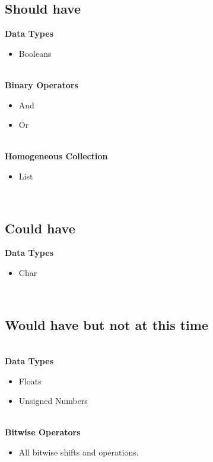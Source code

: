 \subsection{Should have }
\textbf{Data Types }
\begin{itemize} 
    \item Booleans
\end{itemize} 
\\
\textbf{Binary Operators} 
\begin{itemize} 
    \item And
    \item Or
\end{itemize} 
\\
\textbf{Homogeneous Collection }
\begin{itemize} 
    \item List
\end{itemize} 
\\
\subsection{Could have}
\textbf{Data Types }
\begin{itemize} 
    \item Char
\end{itemize} 
\\
\subsection{Would have but not at this time }
\\
\textbf{Data Types }
\begin{itemize} 
    \item Floats
    \item Unsigned Numbers
\end{itemize} 
\\
\textbf{Bitwise Operators }
\begin{itemize} 
    \item All bitwise shifts and operations. 
\end{itemize} 

\fi
